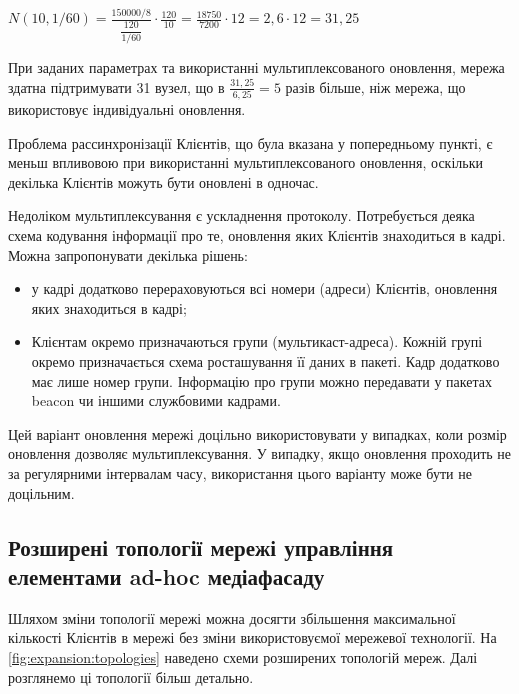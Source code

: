 \documentclass[a4paper,ukrainian,utf8,nocolumnsxix,floatsection,equationsection]{eskdtext}
\begin{document}
$N(10, 1/60) = \frac{150000 / 8}{\dfrac{120}{1/60}} \cdot \frac{120}{10} = 
		\frac{18750}{7200} \cdot 12 = 2,6 \cdot 12 = 31,25$


При заданих параметрах та використанні мультиплексованого оновлення, мережа здатна підтримувати 31 вузел, що в $\frac{31,25}{6,25} = 5$ разів більше, ніж мережа, що використовує індивідуальні оновлення. 

Проблема рассинхронізації Клієнтів, що була вказана у попередньому пункті, є меньш впливовою при використанні мультиплексованого оновлення, оскільки декілька Клієнтів можуть бути оновлені в одночас.

Недоліком мультиплексування є ускладнення протоколу. Потребується деяка схема кодування інформації про те, оновлення яких Клієнтів знаходиться в кадрі. Можна запропонувати декілька рішень:

\begin{itemize}
	\item у кадрі додатково перераховуються всі номери (адреси) Клієнтів, оновлення яких знаходиться в кадрі;
	\item Клієнтам окремо призначаються групи (мультикаст-адреса). Кожній групі окремо призначається схема росташування її даних в пакеті. Кадр додатково має лише номер групи. Інформацію про групи можно передавати у пакетах beacon чи іншими службовими кадрами.
\end{itemize}

Цей варіант оновлення мережі доцільно використовувати у випадках, коли розмір оновлення дозволяє мультиплексування. У випадку, якщо оновлення проходить не за регулярними інтервалам часу, використання цього варіанту може бути не доцільним.

\subsection{Розширені топології мережі управління елементами ad-hoc медіафасаду}

Шляхом зміни топології мережі можна досягти збільшення максимальної кількості Клієнтів в мережі без зміни використовуємої мережевої технології. На \cref{fig:expansion:topologies} наведено схеми розширених топологій мереж. Далі розглянемо ці топології більш детально.

\end{document}
